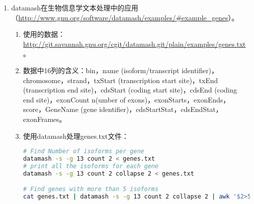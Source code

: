 \begin{enumerate}
\begin{enumerate}
\begin{lstlisting}[language=bash]
# A simple summary of the data, with grouping:
echo "$DATA" | datamash -s --header-out -g 1 min 2 q1 2 median 2 mean 2 q3 2 max 2 | expand -t 18
echo "$DATA" | Rscript -e 'a=read.table("stdin")' -e 'aggregate(a$V2,by=list(a$V1),summary)'

# Calculating mean and standard-deviation for each group:
echo "$DATA" | datamash -s -g 1 mean 2 sstdev 2
echo "$DATA" | Rscript -e 'a=read.table("stdin")' -e 'f=function(x){c(mean(x),sd(x))}' -e 'aggregate(a$V2,by=list(a$V1),f)'
\end{lstlisting}
      \item 反转、转置：
\begin{lstlisting}[language=bash]
# reverse fields:
echo "$DATA" | datamash reverse
echo "$DATA" | perl -lane 'print join(" ", reverse @F)'

# transpose a file (swap rows and columns):
echo "$DATA" | datamash transpose
echo "$DATA" | Rscript -e 'write.table(t(read.table("stdin")),quote=F,col.names=F,row.names=F)'
\end{lstlisting}
    \end{enumerate}
  \item datamash在生物信息学文本处理中的应用（\href{http://www.gnu.org/software/datamash/examples/\#example\_genes}{http://www.gnu.org/software/datamash/examples/\#example\_genes}）。
    \begin{enumerate}
      \item 使用的数据：\href{http://git.savannah.gnu.org/cgit/datamash.git/plain/examples/genes.txt}{http://git.savannah.gnu.org/cgit/datamash.git/plain/examples/genes.txt}。
      \item 数据中16列的含义：bin，name (isoform/transcript identifier)，chromosome，strand，txStart (transcription start site)，txEnd (transcription end site)，cdsStart (coding start site)，cdsEnd (coding end site)，exonCount n(umber of exons)，exonStarts，exonEnds，score，GeneName (gene identifier)，cdsStartStat，cdsEndStat，exonFrames。
      \item 使用datamash处理genes.txt文件：
\begin{lstlisting}[language=bash]
# Find Number of isoforms per gene
datamash -s -g 13 count 2 < genes.txt
# print all the isoforms for each gene
datamash -s -g 13 count 2 collapse 2 < genes.txt

# Find genes with more than 5 isoforms
cat genes.txt | datamash -s -g 13 count 2 collapse 2 | awk '$2>5'


\end{lstlisting}
\end{enumerate}
\end{enumerate}
